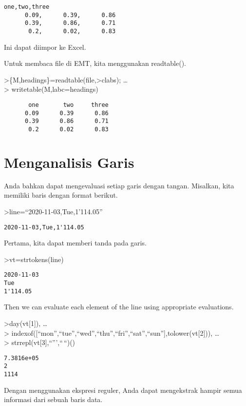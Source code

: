 \documentclass[
]{book}
\begin{document}
\begin{verbatim}
one,two,three
      0.09,      0.39,      0.86
      0.39,      0.86,      0.71
       0.2,      0.02,      0.83
\end{verbatim}

Ini dapat diimpor ke Excel.

Untuk membaca file di EMT, kita menggunakan readtable().

\textgreater\{M,headings\}=readtable(file,\textgreater clabs); \ldots{}\\
\textgreater{} writetable(M,labc=headings)

\begin{verbatim}
       one       two     three
      0.09      0.39      0.86
      0.39      0.86      0.71
       0.2      0.02      0.83
\end{verbatim}

\chapter{Menganalisis Garis}\label{menganalisis-garis}

Anda bahkan dapat mengevaluasi setiap garis dengan tangan. Misalkan, kita memiliki baris dengan format berikut.

\textgreater line=``2020-11-03,Tue,1'114.05''

\begin{verbatim}
2020-11-03,Tue,1'114.05
\end{verbatim}

Pertama, kita dapat memberi tanda pada garis.

\textgreater vt=strtokens(line)

\begin{verbatim}
2020-11-03
Tue
1'114.05
\end{verbatim}

Then we can evaluate each element of the line using appropriate evaluations.

\textgreater day(vt{[}1{]}), \ldots{}\\
\textgreater{} indexof({[}``mon'',``tue'',``wed'',``thu'',``fri'',``sat'',``sun''{]},tolower(vt{[}2{]})), \ldots{}\\
\textgreater{} strrepl(vt{[}3{]},``''',``\,``)()

\begin{verbatim}
7.3816e+05
2
1114
\end{verbatim}

Dengan menggunakan ekspresi reguler, Anda dapat mengekstrak hampir semua informasi dari sebuah baris data.
\end{document}
